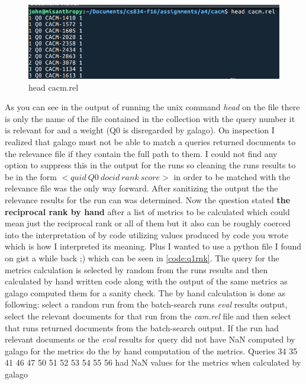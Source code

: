\documentclass[11pt]{article}
\begin{document}
\begin{figure}[H]
\centering
\includegraphics[scale=0.8]{camrell.png}
\caption{head cacm.rel}
\label{fig:cacmrel}
\end{figure}
As you can see in the output of running the unix command \textit{head} on the file there is only the name of the file contained in the collection with the query number it is relevant for and a weight (Q0 is disregarded by galago). On inspection I realized that galago must not be able to match a queries returned documents to the relevance file if they contain the full path to them. I could not find any option to suppress this in the output for the runs so cleaning the runs results to be in the form $<quid \ Q0 \ docid \ rank \ score>$  in order to be matched with the relevance file was the only way forward. After sanitizing the output the the relevance results for the run can was determined. Now the question stated \textbf{the reciprocal rank by hand} after a list of metrics to be calculated which could mean just the reciprocal rank or all of them but it also can be roughly coerced into the interpretation of by code utilizing values produced by code you wrote which is how I interpreted its meaning.  Plus I wanted to use a python file I found on gist a while back ;) which can be seen in \autoref{code:q1rnk}. \newline \newline
The query for the metrics calculation is selected by random from the runs results and then calculated by hand written code along with the output of the same metrics as galago computed them for a sanity check. The by hand calculation is done as following: select a random run from the batch-search runs \textit{eval} results output, select the relevant documents for that run from the \textit{cam.rel} file and  then select that runs returned documents from the batch-search output. If the run had relevant documents or the \textit{eval} results for query did not have NaN computed by galago for the metrics do the by hand computation of the metrics.  Queries 34 35 41 46 47 50 51 52 53 54 55 56 had NaN values for the metrics when calculated by galago\newline \newline
\end{document}
